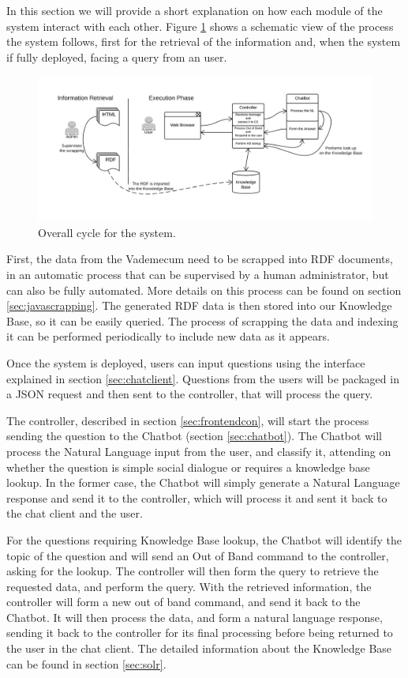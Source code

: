 In this section we will provide a short explanation on how each module of the system interact with each other. Figure \ref{fig:lifecycle} shows a schematic view of the process the system follows, first for the retrieval of the information and, when the system if fully deployed, facing a query from an user.

\begin{figure}[!htbp]
    \centering
    \includegraphics[width=1.1\textwidth]{img/prot/lifecycle.png}
    \caption{Overall cycle for the system.}
    \label{fig:lifecycle}
\end{figure}

First, the data from the Vademecum need to be scrapped into \ac{RDF} documents, in an automatic process that can be supervised by a human administrator, but can also be fully automated. More details on this process can be found on section \ref{sec:javascrapping}. The generated \ac{RDF} data is then stored into our Knowledge Base, so it can be easily queried. The process of scrapping the data and indexing it can be performed periodically to include new data as it appears.

Once the system is deployed, users can input questions using the interface explained in section \ref{sec:chatclient}. Questions from the users will be packaged in a JSON request and then sent to the controller, that will process the query.

The controller, described in section \ref{sec:frontendcon}, will start the process sending the question to the Chatbot (section \ref{sec:chatbot}). The Chatbot will process the Natural Language input from the user, and classify it, attending on whether the question is simple social dialogue or requires a knowledge base lookup. In the former case, the Chatbot will simply generate a Natural Language response and send it to the controller, which will process it and sent it back to the chat client and the user. 

For the questions requiring Knowledge Base lookup, the Chatbot will identify the topic of the question and will send an Out of Band command to the controller, asking for the lookup. The controller will then form the query to retrieve the requested data, and perform the query. With the retrieved information, the controller will form a new out of band command, and send it back to the Chatbot. It will then process the data, and form a natural language response, sending it back to the controller for its final processing before being returned to the user in the chat client. The detailed information about the Knowledge Base can be found in section \ref{sec:solr}.

